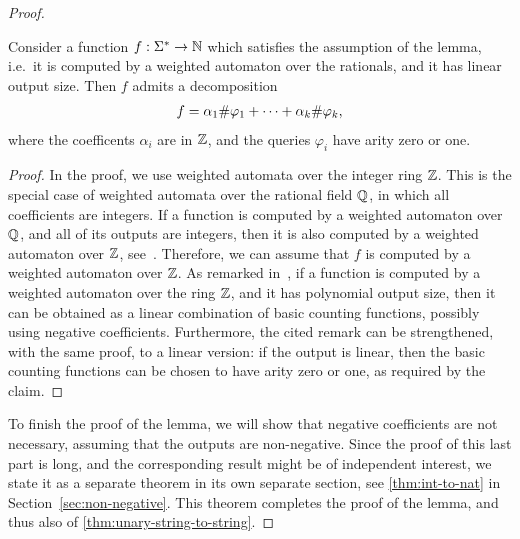 \begin{proof}
\begin{claim}\label{claim:mso-counting-regular-with-negative}
    Consider a function $f : \Sigma^* \to {\mathbb N}$ which satisfies the assumption of the lemma, i.e.~it is computed by a weighted automaton over the rationals, and it has linear output size. Then $f$ admits a decomposition 
    \begin{align*}
    f = \alpha_1 \#{\varphi_1} + \cdots +  \alpha_k \#{\varphi_k},
    \end{align*}        
        where the coefficents $\alpha_i$ are in ${\mathbb Z}$, and the queries $\varphi_i$ have arity zero or one.
\end{claim}
\begin{proof}
    In the proof, we use weighted automata over the integer ring ${\mathbb Z}$. This is the special case of weighted automata over the rational field ${\mathbb Q}$, in which all coefficients are integers. If a function is computed by a weighted automaton over ${\mathbb Q}$, and all of its outputs are integers,  then it is also computed by a weighted automaton over ${\mathbb Z}$,  see~\cite[p. 110]{BerstelReutenauer08}. Therefore, we can assume that $f$ is computed by a weighted automaton over ${\mathbb Z}$.
    As remarked in~\cite[Remark II.21]{Zpolyreg23}, if a function is computed by a weighted automaton over the ring ${\mathbb Z}$, and it has polynomial output size, then it can be obtained as a linear combination of basic counting functions, possibly using negative coefficients. Furthermore, the cited remark can be strengthened, with the same proof, to a linear version: if the output is linear, then the basic counting functions can be chosen to have arity zero or one, as required by the claim.
\end{proof}

To finish the proof of the lemma, we will show that negative coefficients are not necessary, assuming that the outputs are non-negative. Since the  proof of this last part is long, and the corresponding result  might be of independent interest, we state it as a separate theorem in its own separate section, see \cref{thm:int-to-nat} in Section~\ref{sec:non-negative}. This theorem completes the proof of the lemma, and thus also of \cref{thm:unary-string-to-string}.
\end{proof}



